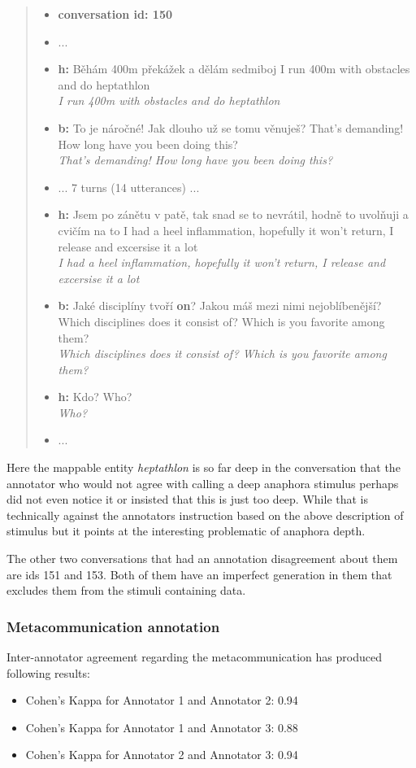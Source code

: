 \documentclass[12pt]{report}
\newcommand{\utterance}[3]{%
    \textbf{#1} #2%
    \ifx\relax#3\relax%
    \else \\ \textit{#3}%
    \fi%
}
\begin{document}
{\begin{quote}
\begin{itemize}[label={}, leftmargin=0pt, itemsep=0.5em]
\item \textbf{conversation id: 150}
\item ...
\item \utterance{h:}{Běhám 400m překážek a dělám sedmiboj}{I run 400m with obstacles and do heptathlon}
\item \utterance{b:}{To je náročné! Jak dlouho už se tomu věnuješ?}{That's demanding! How long have you been doing this?}
\item ... 7 turns (14 utterances) ...
\item \utterance{h:}{Jsem po zánětu v patě, tak snad se to nevrátil, hodně to uvolňuji a cvičím na to}{I had a heel inflammation, hopefully it won't return, I release and excersise it a lot}
\item \utterance{b:}{Jaké disciplíny tvoří \textbf{on}? Jakou máš mezi nimi nejoblíbenější?}{Which disciplines does it consist of? Which is you favorite among them?}
\item \utterance{h:}{Kdo?}{Who?}
\item ...
\end{itemize}
\end{quote}

Here the mappable entity \textit{heptathlon} is so far deep in the conversation that
the annotator who would not agree with calling a deep anaphora stimulus
perhaps did not even notice it or insisted that this is just too deep.
While that is technically against the annotators instruction based on the above description of stimulus
but it points at the interesting problematic of anaphora depth.

The other two conversations that had an annotation disagreement about them are ids 151 and 153.
Both of them have an imperfect generation in them that excludes them from the stimuli containing data.

\subsubsection{Metacommunication annotation}

Inter-annotator agreement regarding the metacommunication has produced following results:

\begin{itemize}[label={}]
\item Cohen's Kappa for Annotator 1 and Annotator 2: 0.94
\item Cohen's Kappa for Annotator 1 and Annotator 3: 0.88
\item Cohen's Kappa for Annotator 2 and Annotator 3: 0.94
\end{itemize}

}
\end{document}
